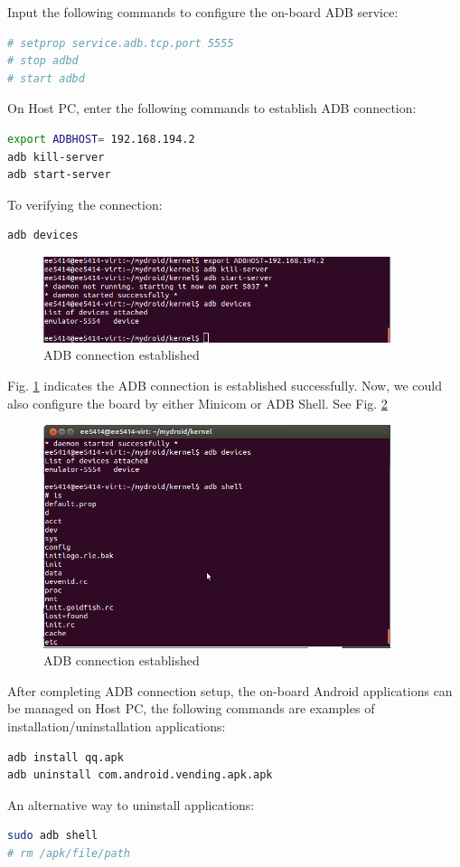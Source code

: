\documentclass[12pt,journal,draftclsnofoot,onecolumn]{IEEEtran}
\begin{document}
Input the following commands to configure the on-board ADB service:
\begin{lstlisting}[language={bash}]
# setprop service.adb.tcp.port 5555
# stop adbd
# start adbd
\end{lstlisting}
On Host PC, enter the following commands to establish ADB connection:
\begin{lstlisting}[language={bash}]
export ADBHOST= 192.168.194.2
adb kill-server
adb start-server
\end{lstlisting}
To verifying the connection:
\begin{lstlisting}[language={bash}]
adb devices
\end{lstlisting}
\begin{figure}[ht]
    \centering
    \includegraphics[width=4in]{./figs/lab2.png}
    \caption{ADB connection established}
    \label{lab2}
\end{figure}
Fig. \ref{lab2} indicates the ADB connection is established successfully.
Now, we could also configure the board by either Minicom or ADB Shell. See Fig. \ref{lab3}
\begin{figure}[ht]
    \centering
    \includegraphics[width=4in]{./figs/lab3.png}
    \caption{ADB connection established}
    \label{lab3}
\end{figure}
After completing ADB connection setup, the on-board Android applications can be managed on Host PC, the following commands are examples of installation/uninstallation applications:
\begin{lstlisting}[language={bash}]
adb install qq.apk
adb uninstall com.android.vending.apk.apk
\end{lstlisting}
An alternative way to uninstall applications:
\begin{lstlisting}[language={bash}]
sudo adb shell
# rm /apk/file/path
\end{lstlisting}
\end{document}
